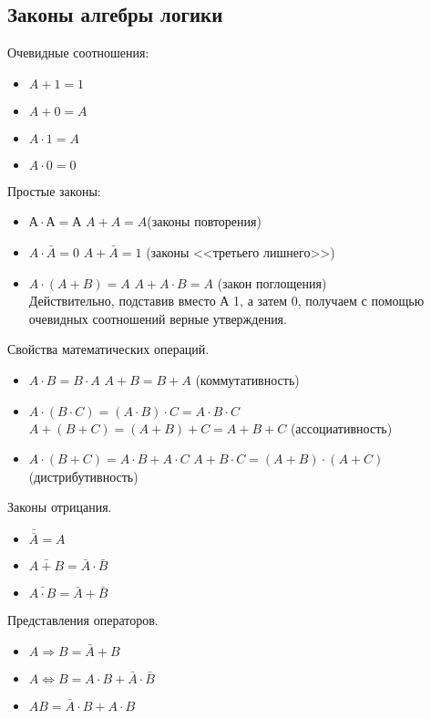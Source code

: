 \documentclass[a4paper, fleqn]{article}
\begin{document}
\subsection*{Законы алгебры логики}
	Очевидные соотношения:
	\begin{itemize}
		\item $A+1 = 1$
		\item $A+0=A$
		\item $A\cdot1=A$
		\item $A\cdot0=0$
	\end{itemize}
	Простые законы:
	\begin{itemize}
		\item $А\cdot А = А$ \qquad $A+A=A$(законы повторения)
		\item $A\cdot\bar{A}=0$ \qquad $A + \bar{A} = 1$ (законы <<третьего лишнего>>)
		\item $A\cdot(A+B)=A$ $A+A\cdot B=A$ (закон поглощения)\\
		Действительно, подставив вместо А 1, а затем 0, получаем с помощью очевидных соотношений верные утверждения.
	\end{itemize}
	
	Свойства математических операций.
	\begin{itemize}
		\item $A\cdot B=B\cdot A$ \qquad $A+B=B+A$ (коммутативность)
		\item $A\cdot(B\cdot C)= (A\cdot B)\cdot C = A\cdot B\cdot C$ \qquad $A+(B+C)=(A+B)+C=A+B+C$ (ассоциативность)
		\item $A\cdot(B+C)=A\cdot B+A\cdot C$ \qquad $A+B\cdot C = (A+B)\cdot(A+C)$  (дистрибутивность)
	\end{itemize}
	
	Законы отрицания.
	\begin{itemize}
		\item $\bar{\bar{A}}=A$
		\item $\bar{A+B}=\bar{A}\cdot\bar{B}$
		\item $\bar{A\cdot B}=\bar{A}+\bar{B}$
	\end{itemize}
	
	Представления операторов.
	\begin{itemize}
		\item $A \Rightarrow B = \bar{A} + B$
		\item $A \Leftrightarrow B = A\cdot B + \bar{A}\cdot \bar{B}$
		\item $A B = \bar{A}\cdot B + A\cdot B$
	\end{itemize}
	
\end{document}

